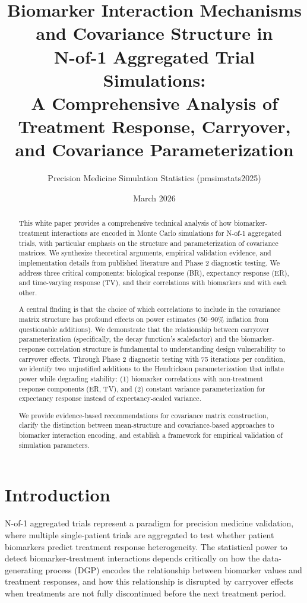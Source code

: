 \documentclass[12pt,a4paper]{article}
\title{Biomarker Interaction Mechanisms and Covariance Structure in\\N-of-1 Aggregated Trial Simulations:\\
A Comprehensive Analysis of Treatment Response, Carryover, and Covariance Parameterization}
\author{Precision Medicine Simulation Statistics (pmsimstats2025)}
\date{March 2026}
\begin{document}
\maketitle

\begin{abstract}

This white paper provides a comprehensive technical analysis of how biomarker-treatment interactions are encoded in Monte Carlo simulations for N-of-1 aggregated trials, with particular emphasis on the structure and parameterization of covariance matrices. We synthesize theoretical arguments, empirical validation evidence, and implementation details from published literature and Phase 2 diagnostic testing. We address three critical components: biological response (BR), expectancy response (ER), and time-varying response (TV), and their correlations with biomarkers and with each other.

A central finding is that the choice of which correlations to include in the covariance matrix structure has profound effects on power estimates (50--90\% inflation from questionable additions). We demonstrate that the relationship between carryover parameterization (specifically, the decay function's scalefactor) and the biomarker-response correlation structure is fundamental to understanding design vulnerability to carryover effects. Through Phase 2 diagnostic testing with 75 iterations per condition, we identify two unjustified additions to the Hendrickson parameterization that inflate power while degrading stability: (1) biomarker correlations with non-treatment response components (ER, TV), and (2) constant variance parameterization for expectancy response instead of expectancy-scaled variance.

We provide evidence-based recommendations for covariance matrix construction, clarify the distinction between mean-structure and covariance-based approaches to biomarker interaction encoding, and establish a framework for empirical validation of simulation parameters.

\end{abstract}

\section{Introduction}

N-of-1 aggregated trials represent a paradigm for precision medicine validation, where multiple single-patient trials are aggregated to test whether patient biomarkers predict treatment response heterogeneity. The statistical power to detect biomarker-treatment interactions depends critically on how the data-generating process (DGP) encodes the relationship between biomarker values and treatment responses, and how this relationship is disrupted by carryover effects when treatments are not fully discontinued before the next treatment period.
\end{document}

